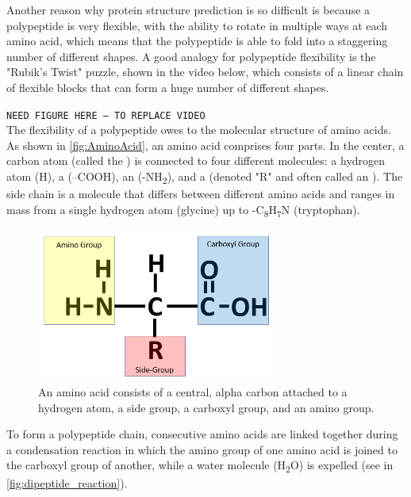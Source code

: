 Another reason why protein structure prediction is so difficult is because a polypeptide is very flexible, with the ability to rotate in multiple ways at each amino acid, which means that the polypeptide is able to fold into a staggering number of different shapes. A good analogy for polypeptide flexibility is the "Rubik's Twist" puzzle, shown in the video below, which consists of a linear chain of flexible blocks that can form a huge number of different shapes.

\texttt{NEED FIGURE HERE -- TO REPLACE VIDEO}\\

The flexibility of a polypeptide owes to the molecular structure of amino acids. As shown in \autoref{fig:AminoAcid}, an amino acid comprises four parts. In the center, a carbon atom (called the ) is connected to four different molecules: a hydrogen atom (H), a  (–COOH), an  (-NH\textsubscript{2}), and a  (denoted "R" and often called an ). The side chain is a molecule that differs between different amino acids and ranges in mass from a single hydrogen atom (glycine) up to -C\textsubscript{8}H\textsubscript{7}N (tryptophan).

\begin{figure}[h]
	\centering
	\mySfFamily
	\includegraphics[width = 0.7\textwidth]{../images/AminoAcid.png}
	\caption{An amino acid consists of a central, alpha carbon attached to a hydrogen atom, a side group, a carboxyl group, and an amino group.}
	\label{fig:AminoAcid}
\end{figure}

To form a polypeptide chain, consecutive amino acids are linked together during a condensation reaction in which the amino group of one amino acid is joined to the carboxyl group of another, while a water molecule (H\textsubscript{2}O) is expelled (see in \autoref{fig:dipeptide_reaction}).

